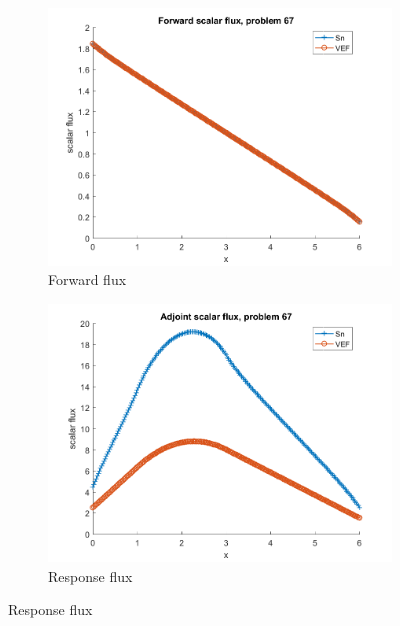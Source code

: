 \documentclass{article}
\begin{document}
\begin{figure}[H]
\label{Case67Flux}
\centering
\begin{subfigure}{.5\textwidth}
  \centering
  \includegraphics[width=.98\linewidth]{IanProposal/figures2/67phi.png}
  \caption{Forward flux}
  \label{fig:sfig1}
\end{subfigure}%
\begin{subfigure}{.5\textwidth}
  \centering
  \includegraphics[width=.98\linewidth]{IanProposal/figures2/67phia.png}
  \caption{Response flux}
  \label{fig:sfig4}
\end{subfigure}%
\end{figure}
\end{document}
